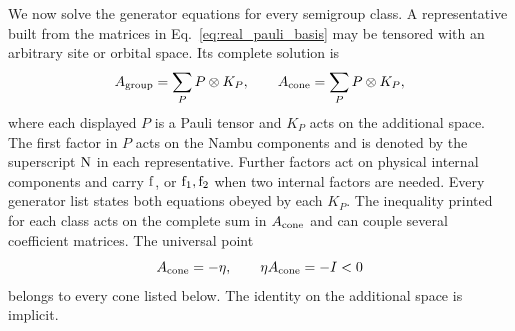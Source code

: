 We now solve the generator equations for every semigroup class.  A representative built from the matrices in Eq.~\eqref{eq:real_pauli_basis} may be tensored with an arbitrary site or orbital space.  Its complete solution is
\begin{equation}
    A_{\rm group}=\sum_P P\otimes K_P,
    \qquad
    A_{\rm cone}=\sum_P P\otimes K_P,
    \label{eq:pauli_generator_expansion}
\end{equation}
where each displayed \(P\) is a Pauli tensor and \(K_P\) acts on the additional space.  The first factor in \(P\) acts on the Nambu components and is denoted by the superscript \({\rm N}\) in each representative.  Further factors act on physical internal components and carry \({\rm f}\), or \({\rm f}_1,{\rm f}_2\) when two internal factors are needed.  Every generator list states both equations obeyed by each \(K_P\).  The inequality printed for each class acts on the complete sum in \(A_{\rm cone}\) and can couple several coefficient matrices.  The universal point
\begin{equation}
    A_{\rm cone}=-\eta,
    \qquad
    \eta A_{\rm cone}=-I<0
    \label{eq:negative_direction}
\end{equation}
belongs to every cone listed below.  The identity on the additional space is implicit.

